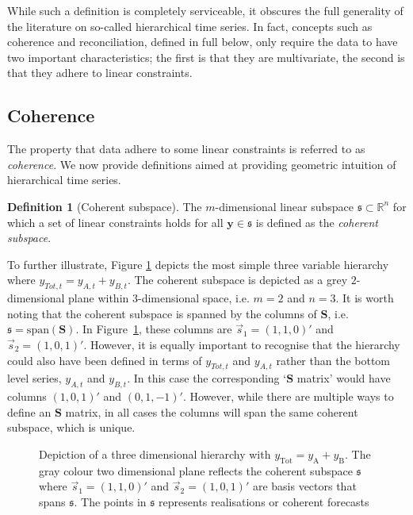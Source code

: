 \documentclass[12pt]{article}
\theoremstyle{definition}
\newtheorem{definition}{Definition}[section]
\theoremstyle{property}
\begin{document}
	While such a definition is completely serviceable, it obscures the full generality of the literature on so-called hierarchical time series.  In fact, concepts such as coherence and reconciliation, defined in full below, only require the data to have two important characteristics; the first is that they are multivariate, the second is that they adhere to linear constraints.  
	
	\subsection{Coherence}\label{sec:cohpointf}
	
	The property that data adhere to some linear constraints is referred to as {\em coherence}.  We now provide definitions aimed at providing geometric intuition of hierarchical time series.
	
	 \begin{definition}[Coherent subspace]\label{def:cohspace}
	 	The $m$-dimensional linear subspace $\mathfrak{s}\subset \mathbb{R}^n$ for which a set of linear constraints holds for all $\bm{y}\in\mathfrak{s}$ is defined as the \emph{coherent subspace}.
	 \end{definition}
 
     To further illustrate, Figure \ref{fig:3D_hierarchy} depicts the most simple three variable hierarchy where $y_{Tot,t}=y_{A,t}+y_{B,t}$.  The coherent subspace is depicted as a grey $2$-dimensional plane within $3$-dimensional space, i.e. $m=2$ and $n=3$.  It is worth noting that the coherent subspace is spanned by the columns of $\bm{S}$, i.e.\ $\mathfrak{s}=\text{span}(\bm{S})$.  In Figure~\ref{fig:3D_hierarchy}, these columns are $\vec{s}_1=(1,1,0)'$ and $\vec{s}_2=(1,0,1)'$.  However, it is equally important to recognise that the hierarchy could also have been defined in terms of $y_{Tot,t}$ and $y_{A,t}$ rather than the bottom level series, $y_{A,t}$ and $y_{B,t}$. In this case the corresponding `$\bm{S}$ matrix' would have columns $(1,0,1)'$ and $(0,1,-1)'$.  However, while there are multiple ways to define an $\bm{S}$ matrix, in all cases the columns will span the same coherent subspace, which is unique.
     
     \begin{figure}[H]
     	\centering
     	\vspace{-0.9cm}
     	\small
     	\resizebox{\linewidth}{!}{
     		
     	}
     	\caption{Depiction of a three dimensional hierarchy with $y_{\text{Tot}} = y_{\text{A}} + y_{\text{B}}$. The gray colour two dimensional plane reflects the coherent subspace $\mathfrak{s}$ where $\vec{s}_1 = (1,1,0)'$ and $\vec{s}_2 = (1, 0, 1)'$ are basis vectors that spans $\mathfrak{s}$. The points in $\mathfrak{s}$ represents realisations or coherent forecasts}\label{fig:3D_hierarchy}
     \end{figure}
     
\end{document}
